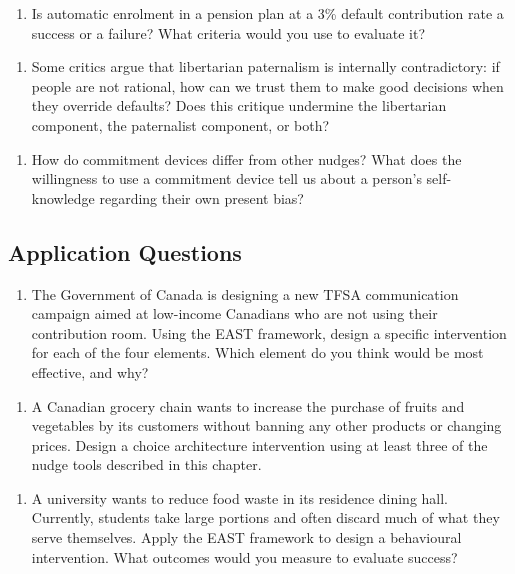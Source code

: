 \documentclass[12pt, letterpaper]{article}
\begin{document}
\begin{enumerate}
\item Is automatic enrolment in a pension plan at a 3\% default contribution rate a success or a failure? What criteria would you use to evaluate it?
\end{enumerate}

\begin{enumerate}
\item Some critics argue that libertarian paternalism is internally contradictory: if people are not rational, how can we trust them to make good decisions when they override defaults? Does this critique undermine the libertarian component, the paternalist component, or both?
\end{enumerate}

\begin{enumerate}
\item How do commitment devices differ from other nudges? What does the willingness to use a commitment device tell us about a person's self-knowledge regarding their own present bias?
\end{enumerate}


\subsection{Application Questions}


\begin{enumerate}
\item The Government of Canada is designing a new TFSA communication campaign aimed at low-income Canadians who are not using their contribution room. Using the EAST framework, design a specific intervention for each of the four elements. Which element do you think would be most effective, and why?
\end{enumerate}

\begin{enumerate}
\item A Canadian grocery chain wants to increase the purchase of fruits and vegetables by its customers without banning any other products or changing prices. Design a choice architecture intervention using at least three of the nudge tools described in this chapter.
\end{enumerate}

\begin{enumerate}
\item A university wants to reduce food waste in its residence dining hall. Currently, students take large portions and often discard much of what they serve themselves. Apply the EAST framework to design a behavioural intervention. What outcomes would you measure to evaluate success?
\end{enumerate}
\end{document}
